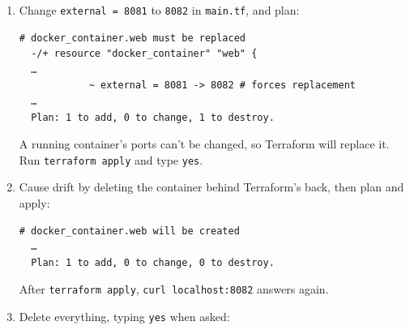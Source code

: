 \begin{enumerate}
  \begin{codeblock}
  \begin{Verbatim}[formatcom=\outputstyle]
  No changes. Your infrastructure matches the configuration.
  …
  \end{Verbatim}
  \end{codeblock}
\item
  Change \texttt{external\ =\ 8081} to \texttt{8082} in \texttt{main.tf}, and plan:

  \begin{codeblock}
  \begin{Verbatim}[formatcom=\outputstyle]
    # docker_container.web must be replaced
  -/+ resource "docker_container" "web" {
  …
            ~ external = 8081 -> 8082 # forces replacement
  …
  Plan: 1 to add, 0 to change, 1 to destroy.
  \end{Verbatim}
  \end{codeblock}

  A running container's ports can't be changed, so Terraform will replace it. Run \texttt{terraform\ apply} and type \texttt{yes}.
\item
  Cause drift by deleting the container behind Terraform's back, then plan and apply:

  \begin{codeblock}

\begin{Shaded}
\begin{Highlighting}[]
\end{Highlighting}
\end{Shaded}

  \end{codeblock}

  \begin{codeblock}
  \begin{Verbatim}[formatcom=\outputstyle]
    # docker_container.web will be created
  …
  Plan: 1 to add, 0 to change, 0 to destroy.
  \end{Verbatim}
  \end{codeblock}

  After \texttt{terraform\ apply}, \texttt{curl\ localhost:8082} answers again.
\item
  Delete everything, typing \texttt{yes} when asked:

  \begin{codeblock}


\end{codeblock}
\end{enumerate}
